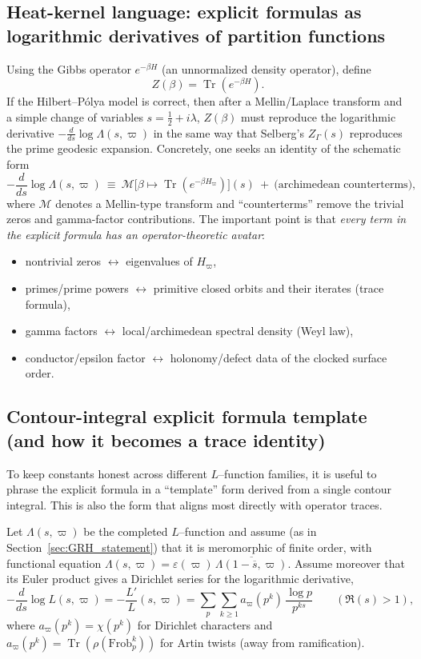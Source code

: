 \documentclass[11pt,oneside]{amsbook}
\numberwithin{equation}{section}
\theoremstyle{plain}
\theoremstyle{definition}
\theoremstyle{remark}
\DeclareMathOperator{\Tr}{\mathrm{Tr}}
\begin{document}
\subsection{Heat-kernel language: explicit formulas as logarithmic derivatives of partition functions}
Using the Gibbs operator $e^{-\beta H}$ (an unnormalized density operator), define
\[
Z(\beta)=\Tr(e^{-\beta H}).
\]
If the Hilbert--Pólya model is correct, then after a Mellin/Laplace transform and a simple change of variables $s=\tfrac12+i\lambda$, $Z(\beta)$ must reproduce the logarithmic derivative $-\frac{d}{ds}\log\Lambda(s,\varpi)$ in the same way that Selberg's $Z_\Gamma(s)$ reproduces the prime geodesic expansion.
Concretely, one seeks an identity of the schematic form
\[
-\frac{d}{ds}\log\Lambda(s,\varpi)
\ \equiv\
\mathcal{M}\bigl[\beta\mapsto \Tr(e^{-\beta H_\varpi})\bigr](s)
\ +\ \text{(archimedean counterterms)},
\]
where $\mathcal{M}$ denotes a Mellin-type transform and ``counterterms'' remove the trivial zeros and gamma-factor contributions.
The important point is that \emph{every term in the explicit formula has an operator-theoretic avatar}:
\begin{itemize}
\item nontrivial zeros $\leftrightarrow$ eigenvalues of $H_\varpi$,
\item primes/prime powers $\leftrightarrow$ primitive closed orbits and their iterates (trace formula),
\item gamma factors $\leftrightarrow$ local/archimedean spectral density (Weyl law),
\item conductor/epsilon factor $\leftrightarrow$ holonomy/defect data of the clocked surface order.
\end{itemize}



\subsection{Contour-integral explicit formula template (and how it becomes a trace identity)}
\label{sec:contour_explicit_formula_template}

To keep constants honest across different $L$--function families, it is useful to phrase the explicit formula in a ``template'' form derived from a single contour integral.
This is also the form that aligns most directly with operator traces.

Let $\Lambda(s,\varpi)$ be the completed $L$--function and assume (as in Section~\ref{sec:GRH_statement}) that it is meromorphic of finite order, with functional equation
$\Lambda(s,\varpi)=\varepsilon(\varpi)\,\overline{\Lambda(1-\overline{s},\varpi)}$.
Assume moreover that its Euler product gives a Dirichlet series for the logarithmic derivative,
\begin{equation}
\label{eq:log_derivative_generic}
-\frac{d}{ds}\log L(s,\varpi)= -\frac{L'}{L}(s,\varpi)
=\sum_{p}\sum_{k\ge 1} a_\varpi(p^k)\,\frac{\log p}{p^{ks}}
\qquad (\Re(s)>1),
\end{equation}
where $a_\varpi(p^k)=\chi(p^k)$ for Dirichlet characters and $a_\varpi(p^k)=\Tr(\rho(\mathrm{Frob}_p^k))$ for Artin twists (away from ramification).
\end{document}
